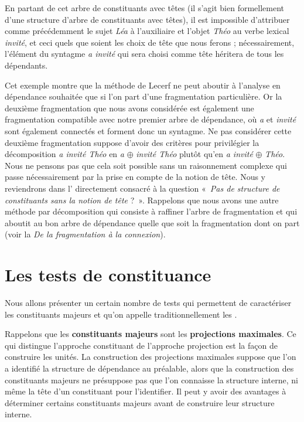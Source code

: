 {    En partant de cet arbre de constituants avec têtes (il s’agit bien formellement d’une structure d’arbre de constituants avec têtes), il est impossible d’attribuer comme précédemment le sujet \textit{Léa} à l’auxiliaire et l’objet \textit{Théo} au verbe lexical \textit{invité}, et ceci quels que soient les choix de tête que nous ferons ; nécessairement, l’élément du syntagme \textit{a invité} qui sera choisi comme tête héritera de tous les dépendants.

    Cet exemple montre que la méthode de Lecerf ne peut aboutir à l’analyse en dépendance souhaitée que si l’on part d’une fragmentation particulière. Or la deuxième fragmentation que nous avons considérée est également une fragmentation compatible avec notre premier arbre de dépendance, où \textit{a} et \textit{invité} sont également connectés et forment donc un syntagme. Ne pas considérer cette deuxième fragmentation suppose d’avoir des critères pour privilégier la décomposition \textit{a invité Théo} en \textit{a} \textrm{${\oplus}$} \textit{invité Théo} plutôt qu’en \textit{a invité} \textrm{${\oplus}$} \textit{Théo}. Nous ne pensons pas que cela soit possible sans un raisonnement complexe qui passe nécessairement par la prise en compte de la notion de tête. Nous y reviendrons dans l’ directement consacré à la question «~\textit{Pas de structure de constituants sans la notion de tête} ?~». Rappelons que nous avons une autre méthode par décomposition qui consiste à raffiner l’arbre de fragmentation et qui aboutit au bon arbre de dépendance quelle que soit la fragmentation dont on part (voir la  \textit{De la fragmentation à la connexion}).
}
\section{Les tests de constituance}\label{sec:3.4.10}

Nous allons présenter un certain nombre de tests qui permettent de caractériser les constituants majeurs et qu’on appelle traditionnellement les .

Rappelons que les \textbf{constituants majeurs} sont les \textbf{projections maximales}. Ce qui distingue l’approche constituant de l’approche projection est la façon de construire les unités. La construction des projections maximales suppose que l’on a identifié la structure de dépendance au préalable, alors que la construction des constituants majeurs ne présuppose pas que l’on connaisse la structure interne, ni même la tête d’un constituant pour l’identifier. Il peut y avoir des avantages à déterminer certains constituants majeurs avant de construire leur structure interne.

